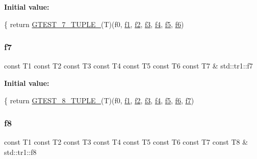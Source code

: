 {\bfseries Initial value\+:}
\begin{DoxyCode}
\{
  \textcolor{keywordflow}{return} \hyperlink{gtest-tuple_8h_a8987baf82ee028d1d778447413a02c0c}{GTEST\_7\_TUPLE\_}(T)(f0, \hyperlink{namespacestd_1_1tr1_a9c0fa65b105f8e2f58ba59ecf75fd000}{f1}, \hyperlink{namespacestd_1_1tr1_a87dd9e009868361317f587126dba63d4}{f2}, \hyperlink{namespacestd_1_1tr1_a0f7c3b47d27d42d82d1a333ea420ce4e}{f3}, \hyperlink{namespacestd_1_1tr1_adc796e02b7385d526aff708189564f67}{f4}, \hyperlink{namespacestd_1_1tr1_a9c1eb66b2b2fa321942af95405232a0d}{f5}, \hyperlink{namespacestd_1_1tr1_a6b62f32e1e3e21bceb94eb46c4cbfd56}{f6})
\end{DoxyCode}
\mbox{\label{namespacestd_1_1tr1_a2185f3a1c07f2df072c39cb91ffa89a4}} 
\subsubsection{\texorpdfstring{f7}{f7}}
{\footnotesize\ttfamily const T1 const T2 const T3 const T4 const T5 const T6 const T7 \& std\+::tr1\+::f7}

{\bfseries Initial value\+:}
\begin{DoxyCode}
\{
  \textcolor{keywordflow}{return} \hyperlink{gtest-tuple_8h_a2bc36d1a71a551e6cda2ac5504fb7ce3}{GTEST\_8\_TUPLE\_}(T)(f0, \hyperlink{namespacestd_1_1tr1_a9c0fa65b105f8e2f58ba59ecf75fd000}{f1}, \hyperlink{namespacestd_1_1tr1_a87dd9e009868361317f587126dba63d4}{f2}, \hyperlink{namespacestd_1_1tr1_a0f7c3b47d27d42d82d1a333ea420ce4e}{f3}, \hyperlink{namespacestd_1_1tr1_adc796e02b7385d526aff708189564f67}{f4}, \hyperlink{namespacestd_1_1tr1_a9c1eb66b2b2fa321942af95405232a0d}{f5}, \hyperlink{namespacestd_1_1tr1_a6b62f32e1e3e21bceb94eb46c4cbfd56}{f6}, 
      \hyperlink{namespacestd_1_1tr1_a2185f3a1c07f2df072c39cb91ffa89a4}{f7})
\end{DoxyCode}
\mbox{\label{namespacestd_1_1tr1_ab998afa41cea8d6d26d7e4288b0bf974}} 
\subsubsection{\texorpdfstring{f8}{f8}}
{\footnotesize\ttfamily const T1 const T2 const T3 const T4 const T5 const T6 const T7 const T8 \& std\+::tr1\+::f8}

